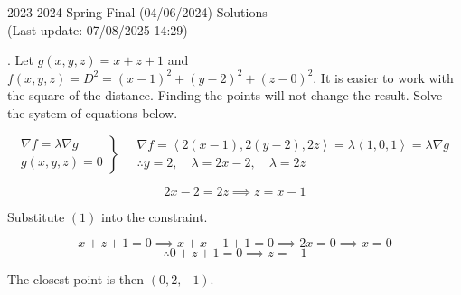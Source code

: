 \documentclass{article}
\begin{document}
\newpage

\begin{center}
2023-2024 Spring Final (04/06/2024) Solutions\\
(Last update: 07/08/2025 14:29)
\end{center}

. Let $g(x,y,z)=x+z+1$ and $f(x,y,z)=D^2=(x-1)^2+(y-2)^2+(z-0)^2$. It is easier to work with the square of the distance. Finding the points will not change the result. Solve the system of equations below.

\[
\left.
\begin{array}{l}
\displaystyle\nabla f=\lambda\nabla g \\
\displaystyle g(x,y,z)=0
\end{array}
\right\}\quad
\begin{array}{l}
\nabla f=\left\langle2(x-1),2(y-2),2z\right\rangle=\lambda\left\langle1,0,1\right\rangle=\lambda\nabla g\\\therefore y=2, \quad\lambda=2x-2,\quad\lambda=2z
\end{array}
\]

\begin{equation}2x-2=2z\implies z=x-1\end{equation}

\hfill

\noindent Substitute $(1)$ into the constraint.

\[x+z+1=0\implies x+x-1+1=0\implies2x=0\implies x=0\]
\[\therefore 0+z+1=0\implies z=-1\]

\hfill

\noindent The closest point is then $\boxed{(0,2,-1)}$.

\hfill
\end{document}
